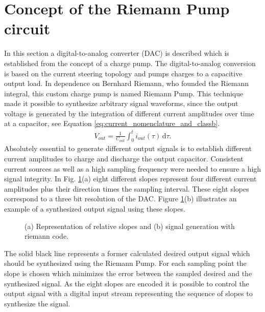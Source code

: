 \documentclass[journal]{IEEEtran}
\begin{document}
\section{Concept of the Riemann Pump circuit}
\label{sec:theory}
%
In this section a digital-to-analog converter (DAC) is described which is established from the concept of a charge pump.
The digital-to-analog conversion is based on the current steering topology and pumps charges to a capacitive output load.
In dependence on Bernhard Riemann, who founded the Riemann integral, this custom charge pump is named Riemann Pump.
%
This technique made it possible to synthesize arbitrary signal waveforms, since the output voltage is generated by the integration of different current amplitudes over time at a capacitor, see Equation \ref{eq:current_nomenclature_and_classb}.
%
\begin{align}
  V_{out} =  \frac{1}{C_{out}} \int_0^t \! i_{out}(\tau) \, \mathrm{d}\tau.
    \label{eq:current_nomenclature_and_classb}
\end{align}
%
Absolutely essential to generate different output signals is to establish different current amplitudes to charge and discharge the output capacitor.
Consistent current sources as well as a high sampling frequency were needed to ensure a high signal integrity.
In Fig. \ref{fig:SlopeSynthSignal}(a) eight different slopes represent four different current amplitudes plus their direction times the sampling interval.
These eight slopes correspond to a three bit resolution of the DAC. 
Figure \ref{fig:SlopeSynthSignal}(b) illustrates an example of a synthesized output signal using these slopes.
%
\begin{figure}[htb]
  \centering
	\begin{scriptsize}
  	\def\svgwidth{\columnwidth}
 	 
  	\caption{(a) Representation of relative slopes and (b) signal generation with riemann code.}
  	\label{fig:SlopeSynthSignal}
	\end{scriptsize}
\end{figure}
%
The solid black line represents a former calculated desired output signal which should be synthesized using the Riemann Pump.
For each sampling point the slope is chosen which minimizes the error between the sampled desired and the synthesized signal.
As the eight slopes are encoded it is possible to control the output signal with a digital input stream representing the sequence of slopes to synthesize the signal.
\end{document}
